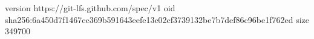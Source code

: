 version https://git-lfs.github.com/spec/v1
oid sha256:6a450d7f1467cc369b591643eefe13c02cf3739132be7b7def86c96be1f762ed
size 349700
